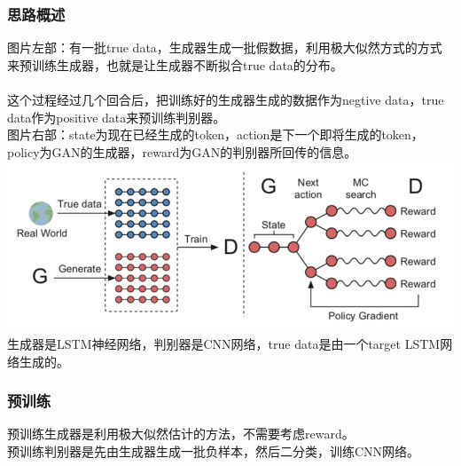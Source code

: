 \documentclass[11pt,a4paper]{ctexart}
\begin{document}
\subsubsection{思路概述}
\noindent 图片左部：有一批true data，生成器生成一批假数据，利用极大似然方式的方式来预训练生成器，也就是让生成器不断拟合true data的分布。\\\\
这个过程经过几个回合后，把训练好的生成器生成的数据作为negtive data，true data作为positive data来预训练判别器。\\
图片右部：state为现在已经生成的token，action是下一个即将生成的token，policy为GAN的生成器，reward为GAN的判别器所回传的信息。\\
\includegraphics[scale=1]{1.png}\\
\noindent 生成器是LSTM神经网络，判别器是CNN网络，true data是由一个target LSTM网络生成的。
\subsubsection{预训练}
\noindent 预训练生成器是利用极大似然估计的方法，不需要考虑reward。\\
预训练判别器是先由生成器生成一批负样本，然后二分类，训练CNN网络。
\end{document}
